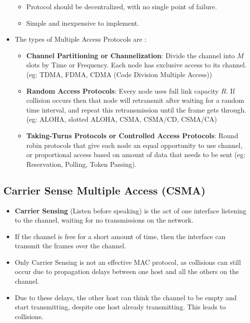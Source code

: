 \documentclass[a4paper]{article}
\theoremstyle{plain}
\theoremstyle{definition}
\begin{document}
\begin{itemize}
\begin{itemize}
        \item Protocol should be decentralized, with no single point of failure. 
        
        \item Simple and inexpensive to implement. 
    \end{itemize}
    
    \item The types of Multiple Access Protocols are : 
    \begin{itemize}
        \item \textbf{Channel Partitioning or Channelization}: Divide the channel into $M$ slots by Time or Frequency. Each node has exclusive access to its channel. (eg: TDMA, FDMA, CDMA (Code Division Multiple Access))
        
        \item \textbf{Random Access Protocols}: Every node uses full link capacity $R$. If collision occurs then that node will retransmit after waiting for a random time interval, and repeat this retransmission until the frame gets through. (eg: ALOHA, slotted ALOHA, CSMA, CSMA/CD, CSMA/CA)
        
        \item \textbf{Taking-Turns Protocols or Controlled Access Protocols}: Round robin protocols that give each node an equal opportunity to use channel, or proportional access based on amount of data that needs to be sent (eg: Reservation, Polling, Token Passing). 
    \end{itemize}
\end{itemize}

\subsection{Carrier Sense Multiple Access (CSMA)}
\begin{itemize}
    \item \textbf{Carrier Sensing}  (Listen before speaking) is the act of one interface listening to the channel, waiting for no transmissions on the network. 
    
    \item If the channel is free for a short amount of time, then the interface can transmit the frames over the channel. 
    
    \item Only Carrier Sensing is not an effective MAC protocol, as collisions can still occur due to propagation delays between one host and all the others on the channel. 
    
    \item Due to these delays, the other host can think the channel to be empty and start transmitting, despite one host already transmitting. This leads to collisions.
\end{itemize}
\end{document}
